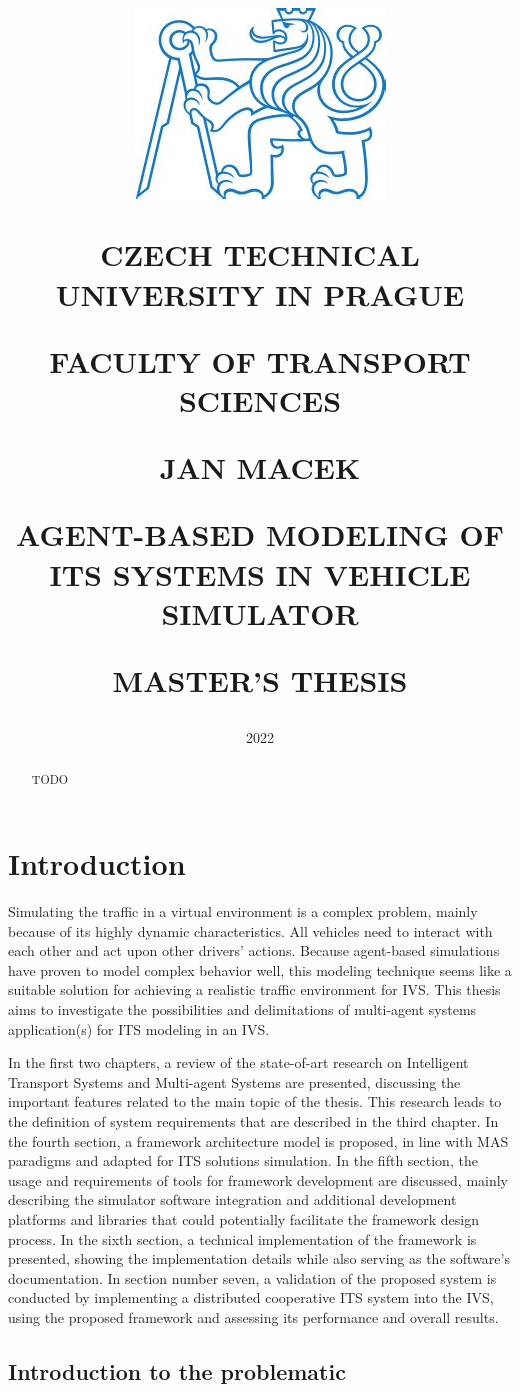 \documentclass[titlepage, 12pt]{article}
\title{
\includegraphics[width=.3\textwidth]{cvut-logo.jpg}\par
\vspace{10mm}
\indent
\textbf{CZECH TECHNICAL UNIVERSITY IN PRAGUE}

FACULTY OF TRANSPORT SCIENCES

\vfill

{\Large JAN MACEK}
\vspace{10mm}

AGENT-BASED MODELING OF ITS SYSTEMS IN VEHICLE SIMULATOR 
\vspace{15mm}

{\Large MASTER'S THESIS}
\vfill

}
\date{\Large 2022}
\begin{document}
\setlength{\baselineskip}{1.5em}
\maketitle



\begin{abstract}
    TODO
\end{abstract}

\tableofcontents
\newpage

\section{Introduction}

Simulating the traffic in a virtual environment is a complex problem, mainly because of
its highly dynamic characteristics. All vehicles need to interact with
each other and act upon other drivers' actions. Because agent-based simulations
have proven to model complex behavior well, this modeling technique seems like
a suitable solution for achieving a realistic traffic environment for IVS. This thesis aims to
investigate the possibilities and delimitations of multi-agent systems application(s) for ITS
modeling in an IVS. 

In the first two chapters, a review of the state-of-art research on Intelligent 
Transport Systems and Multi-agent Systems are presented, discussing the important 
features related to the main topic of the thesis. This research leads to the definition of system
requirements that are described in the third chapter. In the 
fourth section, a framework architecture model is proposed, in line with 
MAS paradigms and adapted for ITS solutions simulation. In the fifth section, the
usage and requirements of tools for framework development are discussed, mainly describing the simulator software integration
and additional development platforms and libraries that could potentially facilitate the
framework design process. In the sixth section, a technical implementation of the 
framework is presented, showing the implementation details while also serving as the 
software's documentation. In section number seven, a validation of the proposed 
system is conducted by implementing a distributed cooperative ITS system into the
IVS, using the proposed framework and assessing its performance and overall results.

\subsection{Introduction to the problematic}
\end{document}
